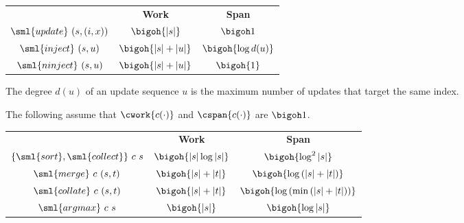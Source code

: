 \begin{cluster}
\label{grp:cst:array-seq::updates}

\begin{costspec}[Updates]
\label{cst:array-seq::updates}
\begin{tabular}{c|c|c}
& \textbf{Work} & \textbf{Span} \\
$\sml{update}~(s,(i,x))$ &
$\bigoh{|s|}$ &
$\bigoh 1$ \\
$\sml{inject}~(s,u)$ &
$\bigoh{|s| + |u|}$ &
$\bigoh{\log d(u)}$ \\
$\sml{ninject}~(s,u)$ &
$\bigoh{|s| + |u|}$ &
$\bigoh{1}$ \\
\end{tabular}

The degree $d(u)$ of an update sequence $u$ is the maximum number of
updates that target the same index.

\end{costspec}
\end{cluster}

\begin{cluster}
\label{grp:cst:array-seq::comparisons-and-sorting}

\begin{costspec}
\label{cst:array-seq::comparisons-and-sorting}
The following assume that $\cwork{c(\cdot)}$ and $\cspan{c(\cdot)}$ are $\bigoh 1$.
\begin{tabular}{c|c|c}
& \textbf{Work} & \textbf{Span} \\
$\{\sml{sort},\sml{collect}\}~c~s$ &
$\displaystyle \bigoh{|s|\log{|s|}}$ &
$\displaystyle \bigoh{\log^2{|s|}}$ \\
$\sml{merge}~c~(s,t)$ &
$\displaystyle \bigoh{|s| + |t|}$ &
$\displaystyle \bigoh{\log\left(|s| + |t|\right)}$ \\
$\sml{collate}~c~(s,t)$ &
$\displaystyle \bigoh{|s| + |t|}$ &
$\displaystyle \bigoh{\log\left(\min\left(|s| + |t|\right)\right)}$ \\
$\sml{argmax}~c~s$ &
$\displaystyle \bigoh{|s|}$ &
$\displaystyle \bigoh{\log{|s|}}$ \\
\end{tabular}

\end{costspec}
\end{cluster}

